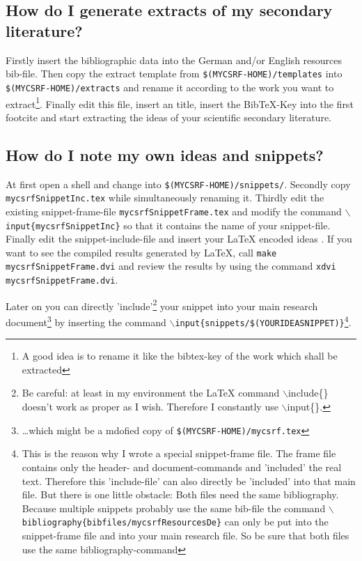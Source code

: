 \documentclass[
  DIV=calc,
  BCOR=5mm,
  11pt,
  headings=small,
  oneside,
  abstract=true,
  toc=bib,
  ngerman,english]{scrartcl}
\begin{document}
\subsection{How do I generate extracts of my secondary literature?}
Firstly insert the bibliographic data into the German and/or English
resources bib-file. Then copy the extract template from
\texttt{\$(MYCSRF-HOME)/templates} into
\texttt{\$(MYCSRF-HOME)/extracts} and rename it according to the work you
want to extract\footnote{A good idea is to rename it like the bibtex-key of the
work which shall be extracted}. Finally edit this file, insert an title, insert
the BibTeX-Key into the first footcite and start extracting the ideas of your
scientific secondary literature.

\subsection{How do I note my own ideas and snippets?}
At first open a shell and change into \texttt{\$(MYCSRF-HOME)/snippets/}.
Se\-cond\-ly copy \texttt{mycsrfSnippetInc.tex} while simultaneously renaming
it. Thirdly edit the existing snippet-frame-file \texttt{mycsrfSnippetFrame.tex}
and modify the command \texttt{$\backslash$input\{mycsrfSnippetInc\}} so that it
contains the name of your snippet-file. Finally edit the snippet-include-file
and insert your LaTeX encoded ideas . If you want to see the compiled results
generated by LaTeX, call \texttt{make mycsrfSnippetFrame.dvi} and review the
results by using the command \texttt{xdvi mycsrfSnippetFrame.dvi}.

Later on you can directly 'include'\footnote{Be careful: at least in my
environment the LaTeX command $\backslash$include\{\} doesn't work as proper as
I wish. Therefore I constantly use $\backslash$input\{\}.} your snippet into
your main research document\footnote{\ldots which might be a mdofied copy of
\texttt{\$(MYCSRF-HOME)/mycsrf.tex}} by inserting the command
\texttt{$\backslash$input\{snippets/\$(YOURIDEASNIPPET)\}}\footnote{This is the
reason why I wrote a special snippet-frame file. The frame file contains only
the header- and document-commands and 'included' the real text. Therefore this
'include-file' can also directly be 'included' into that main file. But there is
one little obstacle: Both files need the same bibliography. Because multiple
snippets probably use the same bib-file the command
\texttt{$\backslash$bibliography\{\-bibfiles/\-mycsrfResourcesDe\}} can only be
put into the snippet-frame file and into your main research file. So be sure
that both files use the same bibliography-command}.
\end{document}
